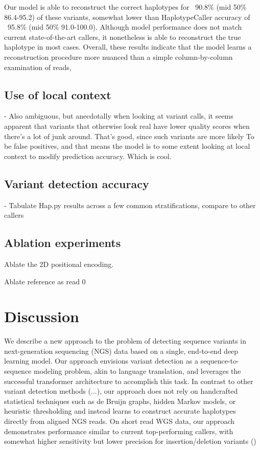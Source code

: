 \documentclass[]{article}
\begin{document}
 Our model is able to reconstruct the correct haplotypes for ~90.8\% (mid 50\% 86.4-95.2) of these variants, somewhat lower than HaplotypeCaller accuracy of ~95.8\% (mid 50\% 91.0-100.0).  Although model performance does not match current state-of-the-art callers, it nonetheless is able to reconstruct the true haplotype in most cases. Overall, these results indicate that the model learns a reconstruction procedure more nuanced than a simple column-by-column examination of reads, 


\subsection{Use of local context}
 - Also ambiguous, but anecdotally when looking at variant calls, it seems apparent that variants that otherwise look real have lower quality scores when there's a lot of junk around. That's good, since such variants are more likely To
 be false positives, and that means the model is to some extent looking at local context to modify prediction accuracy. Which is cool. 



 \subsection{Variant detection accuracy}

 - Tabulate Hap.py results across a few common stratifications, compare to other callers

\subsection{Ablation experiments}
 
 Ablate the 2D positional encoding.

 Ablate reference as read 0 
 
 


\section{Discussion}

We describe a new approach to the problem of detecting sequence variants in next-generation sequencing (NGS) data based on a single, end-to-end deep learning model. Our approach envisions variant detection as a sequence-to-sequence modeling problem, akin to language translation, and leverages the successful transformer architecture to accomplish this task. In contrast to other variant detection methods (...), our approach does not rely on handcrafted statistical techniques such as de Bruijn graphs, hidden Markov models, or heuristic thresholding and instead learns to construct accurate haplotypes directly from aligned NGS reads. On short read WGS data, our approach demonstrates performance similar to current top-performing callers, with somewhat higher sensitivity but lower precision for insertion/deletion variants ()
\end{document}
